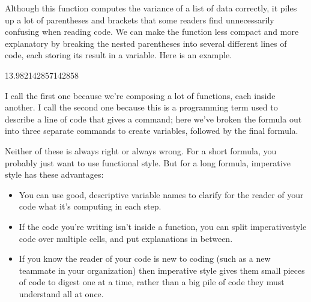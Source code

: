 \documentclass[letterpaper,10pt,english]{sphinxmanual}
\begin{document}
Although this function computes the variance of a list of data correctly, it piles up a lot of parentheses and brackets that some readers find unnecessarily confusing when reading code.  We can make the function less compact and more explanatory by breaking the nested parentheses into several different lines of code, each storing its result in a variable.  Here is an example.

\begin{sphinxVerbatim}[commandchars=\\\{\}]
    
      
        
      \PYG{p}{[}          \PYG{p}{]}
             

  
\end{sphinxVerbatim}

\begin{sphinxVerbatim}[commandchars=\\\{\}]
13.982142857142858
\end{sphinxVerbatim}

I call the first one  because we’re composing a lot of functions, each inside another.  I call the second one  because this is a programming term used to describe a line of code that gives a command; here we’ve broken the formula out into three separate commands to create variables, followed by the final formula.

Neither of these is always right or always wrong.  For a short formula, you probably just want to use functional style.  But for a long formula, imperative style has these advantages:
\begin{itemize}
\item {} 
You can use good, descriptive variable names to clarify for the reader of your code what it’s computing in each step.

\item {} 
If the code you’re writing isn’t inside a function, you can split imperative\sphinxhyphen{}style code over multiple cells, and put explanations in between.

\item {} 
If you know the reader of your code is new to coding (such as a new teammate in your organization) then imperative style gives them small pieces of code to digest one at a time, rather than a big pile of code they must understand all at once.

\end{itemize}
\end{document}
